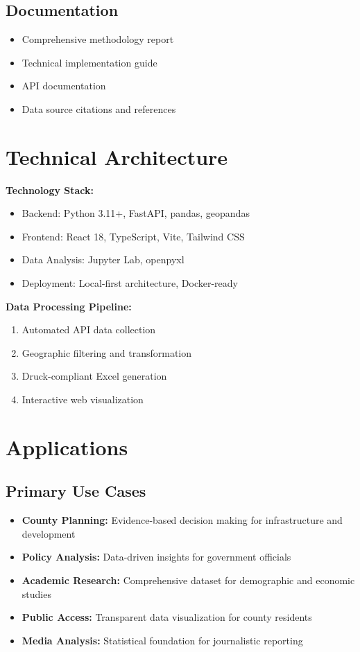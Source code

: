 \documentclass[11pt,letterpaper]{article}
\begin{document}
\subsection*{Documentation}
\begin{itemize}
    \item Comprehensive methodology report
    \item Technical implementation guide
    \item API documentation
    \item Data source citations and references
\end{itemize}

\section*{Technical Architecture}

\textbf{Technology Stack:}
\begin{itemize}
    \item Backend: Python 3.11+, FastAPI, pandas, geopandas
    \item Frontend: React 18, TypeScript, Vite, Tailwind CSS
    \item Data Analysis: Jupyter Lab, openpyxl
    \item Deployment: Local-first architecture, Docker-ready
\end{itemize}

\textbf{Data Processing Pipeline:}
\begin{enumerate}
    \item Automated API data collection
    \item Geographic filtering and transformation
    \item Druck-compliant Excel generation
    \item Interactive web visualization
\end{enumerate}

\section*{Applications}

\subsection*{Primary Use Cases}
\begin{itemize}
    \item \textbf{County Planning:} Evidence-based decision making for infrastructure and development
    \item \textbf{Policy Analysis:} Data-driven insights for government officials
    \item \textbf{Academic Research:} Comprehensive dataset for demographic and economic studies
    \item \textbf{Public Access:} Transparent data visualization for county residents
    \item \textbf{Media Analysis:} Statistical foundation for journalistic reporting
\end{itemize}
\end{document}
